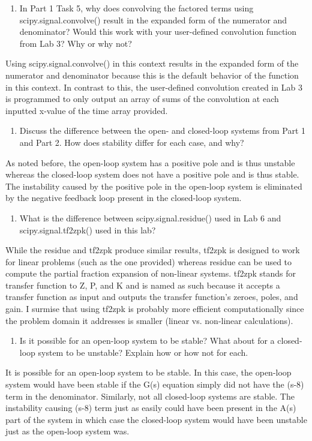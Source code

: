 \documentclass[12pt]{article}
\begin{document}
\begin{enumerate}
    \item In Part 1 Task 5, why does convolving the factored terms using scipy.signal.convolve() result in the expanded form of the numerator and denominator?  Would this work with your user-defined convolution function from Lab 3? Why or why not?
\end{enumerate}
    \par Using scipy.signal.convolve() in this context results in the expanded form of the numerator and denominator because this is the default behavior of the function in this context. In contrast to this, the user-defined convolution created in Lab 3 is programmed to only output an array of sums of the convolution at each inputted x-value of the time array provided.
    
\begin{enumerate}[resume]
    \item Discuss the difference between the open- and closed-loop systems from Part 1 and Part 2. How does stability differ for each case, and why?
\end{enumerate}
    \par As noted before, the open-loop system has a positive pole and is thus unstable whereas the closed-loop system does not have a positive pole and is thus stable. The instability caused by the positive pole in the open-loop system is eliminated by the negative feedback loop present in the closed-loop system.
    
\begin{enumerate}[resume]
    \item  What is the difference between scipy.signal.residue() used in Lab 6 and scipy.signal.tf2zpk() used in this lab?
\end{enumerate}
    \par While the residue and tf2zpk produce similar results, tf2zpk is designed to work for linear problems (such as the one provided) whereas residue can be used to compute the partial fraction expansion of non-linear systems. tf2zpk stands for transfer function to Z, P, and K and is named as such because it accepts a transfer function as input and outputs the transfer function's zeroes, poles, and gain. I surmise that using tf2zpk is probably more efficient computationally since the problem domain it addresses is smaller (linear vs. non-linear calculations).
    
\begin{enumerate}[resume]
    \item  Is it possible for an open-loop system to be stable?  What about for a closed-loop system to be unstable?  Explain how or how not for each.
\end{enumerate}
    \par It is possible for an open-loop system to be stable. In this case, the open-loop system would have been stable if the G(s) equation simply did not have the (s-8) term in the denominator. Similarly, not all closed-loop systems are stable. The instability causing (s-8) term just as easily could have been present in the A(s) part of the system in which case the closed-loop system would have been unstable just as the open-loop system was.
    
\end{document}

